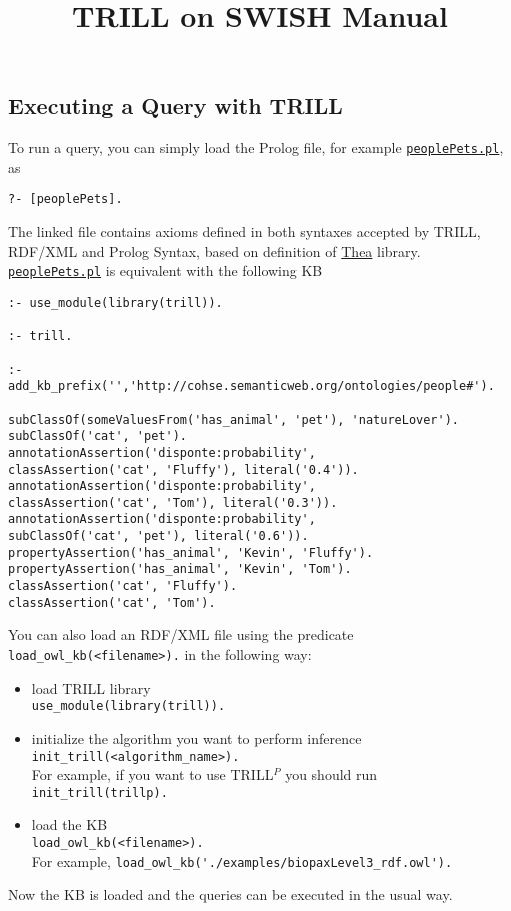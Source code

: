 \documentclass[a4paper,10pt]{scrartcl}
\begin{document}
\title{TRILL on SWISH Manual}
\maketitle






\subsection{Executing a Query with TRILL}
To run a query, you can simply load the Prolog file, for example \href{http://trill.lamping.unife.it/example/trill/peoplePets.pl}{\texttt{peoplePets.pl}}, as
\begin{verbatim}
?- [peoplePets].
\end{verbatim}
\noindent
The linked file contains axioms defined in both syntaxes accepted by TRILL, RDF/XML and Prolog Syntax, based on definition of \href{http://vangelisv.github.io/thea/}{Thea} library.
\href{http://trill.lamping.unife.it/example/trill/peoplePets.pl}{\texttt{peoplePets.pl}} is equivalent with the following KB
\begin{verbatim}
:- use_module(library(trill)).

:- trill.

:- add_kb_prefix('','http://cohse.semanticweb.org/ontologies/people#').

subClassOf(someValuesFrom('has_animal', 'pet'), 'natureLover').
subClassOf('cat', 'pet').
annotationAssertion('disponte:probability', 
classAssertion('cat', 'Fluffy'), literal('0.4')).
annotationAssertion('disponte:probability', 
classAssertion('cat', 'Tom'), literal('0.3')).
annotationAssertion('disponte:probability', 
subClassOf('cat', 'pet'), literal('0.6')).
propertyAssertion('has_animal', 'Kevin', 'Fluffy').
propertyAssertion('has_animal', 'Kevin', 'Tom').
classAssertion('cat', 'Fluffy').
classAssertion('cat', 'Tom').
\end{verbatim}
\noindent


You can also load an RDF/XML file using the predicate \verb|load_owl_kb(<filename>).| in the following way:
\begin{itemize}
	\item load TRILL library\\
	\verb|use_module(library(trill)).|
	\item initialize the algorithm you want to perform inference\\
	\verb|init_trill(<algorithm_name>).|\\
	For example, if you want to use TRILL$^P$ you should run \verb|init_trill(trillp).|
	\item load the KB\\
	\verb|load_owl_kb(<filename>).|\\
	For example, \verb|load_owl_kb('./examples/biopaxLevel3_rdf.owl').|
\end{itemize}
\noindent
Now the KB is loaded and the queries can be executed in the usual way.
\end{document}
